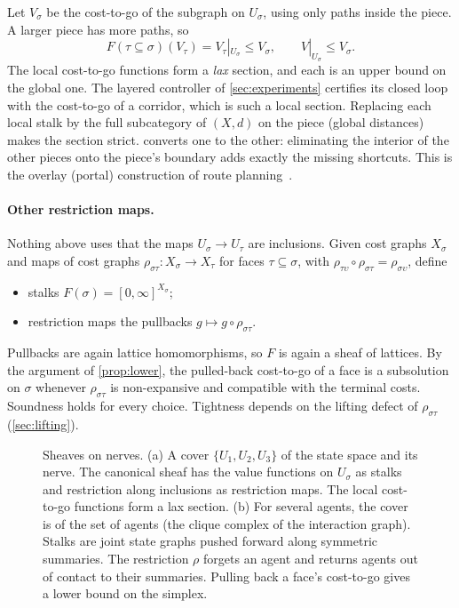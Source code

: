 \documentclass[11pt]{article}
\theoremstyle{definition}
\theoremstyle{remark}
\newcommand{\dd}{d}
\begin{document}
Let $V_\sigma$ be the cost-to-go of the subgraph on $U_\sigma$, using only paths
inside the piece. A larger piece has more paths, so
\[
F(\tau \subseteq \sigma)(V_\tau) = V_\tau|_{U_\sigma} \le V_\sigma,
\qquad V|_{U_\sigma} \le V_\sigma .
\]
The local cost-to-go functions form a \emph{lax} section, and each is an upper
bound on the global one. The layered controller of \cref{sec:experiments}
certifies its closed loop with the cost-to-go of a corridor, which is such a local
section. Replacing each local stalk by the full subcategory of $(X, \dd)$ on the
piece (global distances) makes the section strict.
 converts one to the other: eliminating the interior of the
other pieces onto the piece's boundary adds exactly the missing shortcuts. This is
the overlay (portal) construction of route planning~\cite{delling2011}.

\paragraph{Other restriction maps.}
Nothing above uses that the maps $U_\sigma \to U_\tau$ are inclusions. Given cost
graphs $X_\sigma$ and maps of cost graphs $\rho_{\sigma\tau} : X_\sigma \to X_\tau$
for faces $\tau \subseteq \sigma$, with
$\rho_{\tau\upsilon} \circ \rho_{\sigma\tau} = \rho_{\sigma\upsilon}$, define
\begin{itemize}[nosep]
\item stalks $F(\sigma) = [0,\infty]^{X_\sigma}$;
\item restriction maps the pullbacks $g \mapsto g \circ \rho_{\sigma\tau}$.
\end{itemize}
Pullbacks are again lattice homomorphisms, so $F$ is again a sheaf of lattices.
By the argument of \cref{prop:lower}, the pulled-back cost-to-go of a face is a
subsolution on $\sigma$ whenever $\rho_{\sigma\tau}$ is non-expansive and
compatible with the terminal costs. Soundness holds for every choice. Tightness
depends on the lifting defect of $\rho_{\sigma\tau}$ (\cref{sec:lifting}).

\begin{figure}[t]
\centering

\caption{Sheaves on nerves. (a) A cover $\{U_1,U_2,U_3\}$ of the state space and
its nerve. The canonical sheaf has the value functions on $U_\sigma$ as stalks and
restriction along inclusions as restriction maps. The local cost-to-go functions
form a lax section. (b) For several agents, the cover is of the set of agents (the
clique complex of the interaction graph). Stalks are joint state graphs pushed
forward along symmetric summaries. The restriction $\rho$ forgets an agent and
returns agents out of contact to their summaries. Pulling back a face's cost-to-go
gives a lower bound on the simplex.}
\label{fig:nerve}
\end{figure}
\end{document}
